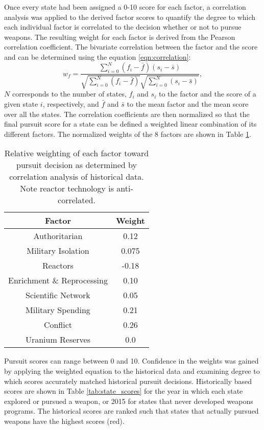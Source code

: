 Once every state had been assigned a 0-10 score for each factor, a correlation
analysis was applied to the derived factor scores to quantify the degree to
which each individual factor is correlated to the decision whether or not to
pursue weapons. The resulting weight for each factor is derived from the Pearson correlation coefficient. The bivariate correlation between the factor and the score and can be determined using the equation \ref{eqn:correlation}:
\begin{equation}
    \label{eqn:correlation}
    w_{f} = \frac{\sum_{i=0}^{N} (f_{i} - \bar{f}) (s_{i} - \bar{s})}
                 {\sqrt{\sum_{i=0}^{N}\left(f_{i} - \bar{f}\right)}
                 \sqrt{\sum_{i=0}^{N}\left(s_{i} - \bar{s}\right)}},
\end{equation}
$N$ corresponds to the number of states, $f_{i}$ and $s_{i}$ to the factor and the score of a given state $i$, respectively,  and $\bar{f}$ and $\bar{s}$ to
the mean factor and the mean score over all the states.  The correlation coefficients are then normalized so that the final pursuit score for a state can be defined a weighted linear combination of its different factors. The normalized weights of the 8 factors are shown in Table \ref{tab:factor_weights}. 

\begin{table}
\centering
\begin{tabular}{|c|c|}
\hline
\textbf{Factor}        & \textbf{Weight} \\
\hline
Authoritarian   & 0.12 \\
Military Isolation & 0.075 \\
Reactors           & -0.18 \\
Enrichment \& Reprocessing & 0.10 \\
Scientific Network & 0.05 \\
Military Spending & 0.21 \\
Conflict  & 0.26 \\
Uranium Reserves &  0.0 \\
\hline
\end{tabular}
\caption{Relative weighting of each factor toward pursuit decision as determined by correlation analysis of historical data. Note reactor technology is anti-correlated.}
\label{tab:factor_weights}
\end{table}

Pursuit scores can range between 0 and 10.  Confidence in the weights was gained by applying the weighted equation to the historical data and examining degree to which scores accurately matched historical pursuit decisions.  Historically based scores are shown in Table \ref{tab:state_scores} for the year in which each state explored or pursued a weapon, or 2015 for states that never developed weapons programs. The historical scores are ranked such that states that actually pursued weapons have the highest scores (red).

